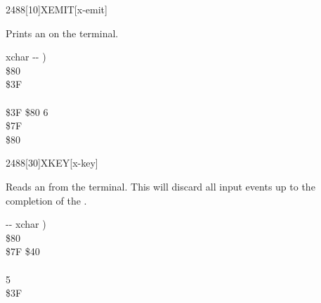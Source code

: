 \begin{worddef}{2488}[10]{XEMIT}[x-emit]%
\item {}

	Prints an  on the terminal.


	\begin{implement} %
	\word{:}   xchar -{}- ) \\
	\tab {} \$80        \\
	  \$3F \\
	\tab {}    \\
	\tab[2]    \$3F  \$80   6   \\
	\tab {} \$7F    \\
	\tab {}  \$80      \\
	\word{;}
	\end{implement}
\end{worddef}


\begin{worddef}{2488}[30]{XKEY}[x-key]%
\item {}

	Reads an  from the terminal.  This will discard all input
	events up to the completion of the .


	\begin{implement} %
	\word{:}   -{}- xchar ) \\
	\tab {}  \$80       \\
	\tab \$7F  \$40  \\
	\tab {}       \\
	   5     \\
	\tab[2] \$3F    \\
	\tab {}   \word{;}
	\end{implement}
\end{worddef}


